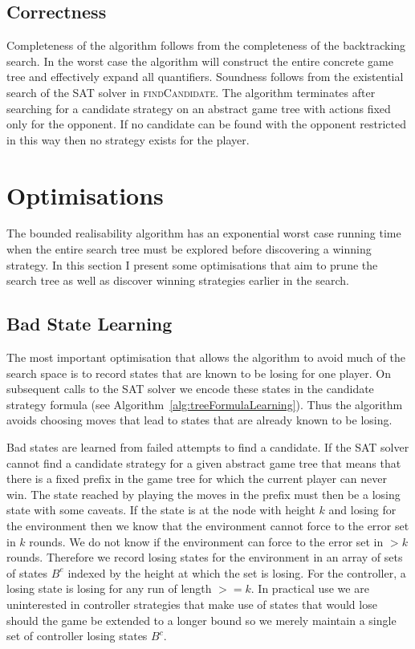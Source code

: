 \subsection{Correctness}

Completeness of the algorithm follows from the completeness of the backtracking search. In the worst case the algorithm will construct the entire concrete game tree and effectively expand all quantifiers. Soundness follows from the existential search of the SAT solver in \textsc{findCandidate}. The algorithm terminates after searching for a candidate strategy on an abstract game tree with actions fixed only for the opponent. If no candidate can be found with the opponent restricted in this way then no strategy exists for the player.

\section{Optimisations}

The bounded realisability algorithm has an exponential worst case running time when the entire search tree must be explored before discovering a winning strategy. In this section I present some optimisations that aim to prune the search tree as well as discover winning strategies earlier in the search.

\subsection{Bad State Learning}
\label{sec:boundedLearning}

The most important optimisation that allows the algorithm to avoid much of the search space is to record states that are known to be losing for one player. On subsequent calls to the SAT solver we encode these states in the candidate strategy formula (see Algorithm~\ref{alg:treeFormulaLearning}). Thus the algorithm avoids choosing moves that lead to states that are already known to be losing.

Bad states are learned from failed attempts to find a candidate. If the SAT solver cannot find a candidate strategy for a given abstract game tree that means that there is a fixed prefix in the game tree for which the current player can never win. The state reached by playing the moves in the prefix must then be a losing state with some caveats. If the state is at the node with height $k$ and losing for the environment then we know that the environment cannot force to the error set in $k$ rounds. We do not know if the environment can force to the error set in $> k$ rounds. Therefore we record losing states for the environment in an array of sets of states $B^e$ indexed by the height at which the set is losing. For the controller, a losing state is losing for any run of length $>= k$. In practical use we are uninterested in controller strategies that make use of states that would lose should the game be extended to a longer bound so we merely maintain a single set of controller losing states $B^c$.

